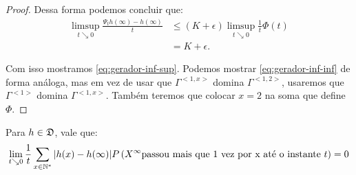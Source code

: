 \begin{proof}
  Dessa forma podemos concluir que:
  \begin{align*}
    \limsup_{t \searrow 0} \frac{\Psi_t h(\infty) - h(\infty)}{t}
    &\leq \left( K + \epsilon \right) \limsup_{t \searrow
      0}\frac{1}{t}  \Phi(t)\\
    &= K + \epsilon.
  \end{align*}


  Com isso mostramos \eqref{eq:gerador-inf-sup}. Podemos mostrar
  \eqref{eq:gerador-inf-inf} de forma análoga, mas em vez de usar que
  $\Gamma^{<1,x>}$ domina $\Gamma^{<1,2>}$, usaremos que $\Gamma^{<1>}$ domina
  $\Gamma^{<1, x>}$. Também teremos que colocar $x = 2$ na soma que
  define $\Phi$.
\end{proof}

\begin{lema}
  \label{lema:gerador-erro}
  Para $h \in {\mathfrak{D}}$, vale que:
  \begin{equation}
    \label{eq:gerador-erro}
    \lim_{t \searrow 0} \frac{1}{t} \sum_{x\in{\mathbb{N^*}}} |h(x) - h(\infty)|
    P\left( X^\infty \text{passou mais que 1 vez por x até o
      instante } t \right) = 0
  \end{equation}
\end{lema}
